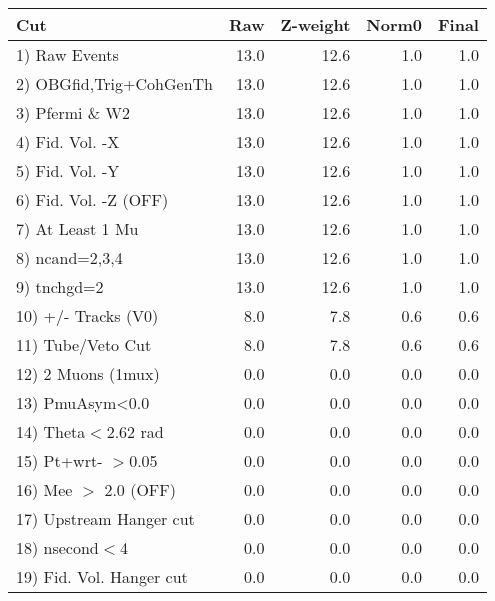  \begin{table}[h!]\centering
 \begin{tabular}{||l||r|r|r|r||}
 \hline
 \hline
 Cut & Raw & Z-weight & Norm0 & Final \\
 \hline
  1) Raw Events           &        13.0 &        12.6 &         1.0 &         1.0 \\
  2) OBGfid,Trig+CohGenTh &        13.0 &        12.6 &         1.0 &         1.0 \\
  3) Pfermi \& W2         &        13.0 &        12.6 &         1.0 &         1.0 \\
  4) Fid. Vol. -X         &        13.0 &        12.6 &         1.0 &         1.0 \\
  5) Fid. Vol. -Y         &        13.0 &        12.6 &         1.0 &         1.0 \\
  6) Fid. Vol. -Z (OFF)   &        13.0 &        12.6 &         1.0 &         1.0 \\
  7) At Least 1 Mu        &        13.0 &        12.6 &         1.0 &         1.0 \\
  8) ncand=2,3,4          &        13.0 &        12.6 &         1.0 &         1.0 \\
  9) tnchgd=2             &        13.0 &        12.6 &         1.0 &         1.0 \\
 10) +/- Tracks (V0)      &         8.0 &         7.8 &         0.6 &         0.6 \\
 11) Tube/Veto Cut        &         8.0 &         7.8 &         0.6 &         0.6 \\
 12) 2 Muons (1mux)       &         0.0 &         0.0 &         0.0 &         0.0 \\
 13) PmuAsym<0.0          &         0.0 &         0.0 &         0.0 &         0.0 \\
 14) Theta$<$2.62 rad     &         0.0 &         0.0 &         0.0 &         0.0 \\
 15) Pt+wrt- $>$0.05      &         0.0 &         0.0 &         0.0 &         0.0 \\
 16) Mee $>$ 2.0  (OFF)   &         0.0 &         0.0 &         0.0 &         0.0 \\
 17) Upstream Hanger cut  &         0.0 &         0.0 &         0.0 &         0.0 \\
 18) nsecond$<$4          &         0.0 &         0.0 &         0.0 &         0.0 \\
 19) Fid. Vol. Hanger cut &         0.0 &         0.0 &         0.0 &         0.0 \\

\end{tabular}
\end{table}
